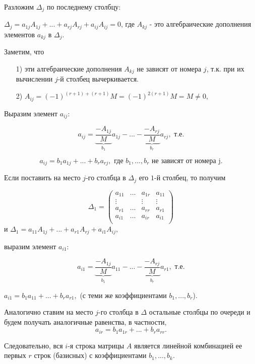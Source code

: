 \begin{enumerate}
Разложим $\Delta_j$ по последнему столбцу:

$\Delta_j = a_{1j}A_{1j} + ... + a_{rj}A_{rj} + a_{ij}A_{ij} = 0$, где $A_{kj}$ - это алгебраические дополнения элементов $a_{kj}$ в $\Delta_j$.

Заметим, что
\begin{enumerate}
    \item[1)] эти алгебраические дополнения $A_{kj}$ не зависят от номера $j$, т.к. при их вычислении $j$-й столбец вычеркивается.
    \item[2)] $A_{ij} = (-1)^{(r + 1) + (r + 1)}M = (-1)^{2(r + 1)}M = M \ne 0,$
\end{enumerate}

Выразим элемент $a_{ij}:$

$$a_{ij} = \underbrace{\frac{-A_{1j}}{M}}_{b_1}a_{1j} - ... - \underbrace{\frac{-A_{rj}}{M}}_{b_r}a_{rj}, \text{ т.е.}$$ 

$$a_{ij} = b_1a_{1j} + ... + b_ra_{rj}, \text{ где } b_1, ..., b_r \text{ не зависят от номера j.}$$ 

Если поставить на место $j$-го столбца в $\Delta_j$ его $1$-й столбец, то получим

$$
\Delta_1 = 
\begin{pmatrix}
    a_{11}&\ldots&a_{1r}&a_{11}\\
    \vdots&&\vdots&\vdots\\
    a_{r1}&\ldots&a_{rr}&a_{r1}\\
    a_{i1}&\ldots&a_{ir}&a_{i1}\\
\end{pmatrix}
$$
и $\Delta_1 = a_{11}A_{1j} + ... + a_{r1}A_{rj} + a_{i1}A_{ij},$

выразим элемент $a_{i1}:$

$$a_{i1} = \underbrace{\frac{-A_{1j}}{M}}_{b_1}a_{11} - ... - \underbrace{\frac{-A_{rj}}{M}}_{b_r}a_{r1},\text{ т.е.}$$ 

$a_{i1} = b_1a_{11} + ... + b_ra_{r1}, $ (с теми же коэффициентами $b_1, ..., b_r$).

Аналогично ставим на место $j$-го столбца в $\Delta$ остальные столбцы по очереди и будем получать аналогичные равенства, в частности,
$$a_{ir} = b_1a_{1r} + ... + b_ra_{rr}.$$

Следовательно, вся $i$-я строка матрицы $A$ является линейной комбинацией ее первых $r$ строк (базисных) с коэффициентами $b_1, ..., b_k$.

\end{enumerate}

